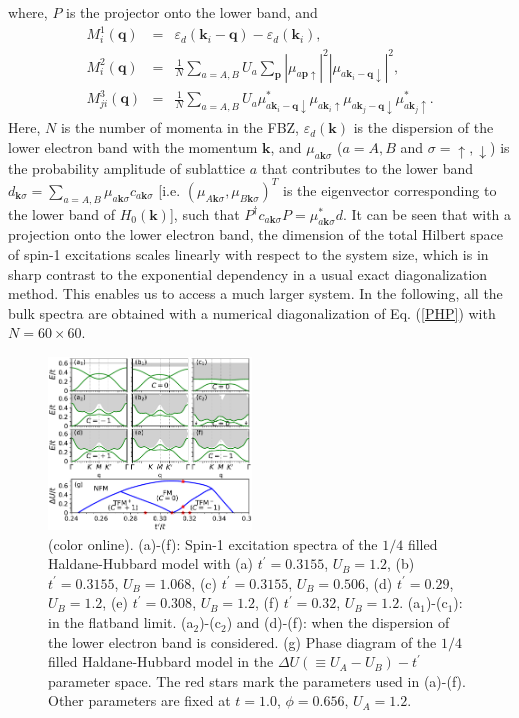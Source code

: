 \documentclass[amsmath,superscriptaddress,showpacs,aps,prl,twocolumn]{revtex4-1}
\begin{document}
where, $P$ is the projector onto the lower band, and
\begin{eqnarray}
M_{i}^1(\mathbf{q}) &=& \varepsilon_d(\mathbf{k}_i-\mathbf{q})-\varepsilon_d(\mathbf{k}_i), \label{M1}\\
M_{i}^2(\mathbf{q}) &=& \frac{1}{N}\sum_{a=A,B}U_a\sum_{\mathbf{p}}\left|\mu_{a\mathbf{p}\uparrow}\right|^2\left|\mu_{a\mathbf{k}_{i}-\mathbf{q}\downarrow}\right|^2, \label{M2}\\
M_{ji}^3(\mathbf{q}) &=& \frac{1}{N}\sum_{a=A,B}U_a
\mu^{\ast}_{a\mathbf{k}_i-\mathbf{q}\downarrow}\mu_{a\mathbf{k}_{i}\uparrow}\mu_{a\mathbf{k}_j-\mathbf{q}\downarrow}\mu^{\ast}_{a\mathbf{k}_{j}\uparrow}. \label{M3}
\end{eqnarray}
Here, $N$ is the number of momenta in the FBZ, $\varepsilon_d(\mathbf{k})$ is the dispersion of the lower electron band with the momentum $\mathbf{k}$, and $\mu_{a\mathbf{k}\sigma}$ ($a=A,B$ and $\sigma=\uparrow,\downarrow$) is the probability amplitude of sublattice $a$ that contributes to the lower band $d_{\mathbf{k}\sigma}=\sum_{a=A,B}\mu_{a\mathbf{k}\sigma}c_{a\mathbf{k}\sigma}$ [i.e. $\left(\mu_{A\mathbf{k}\sigma},\mu_{B\mathbf{k}\sigma}\right)^T$ is the eigenvector corresponding to the lower band of $H_0(\mathbf{k})$], such that $P^\dagger c_{a\mathbf{k}\sigma}P=\mu^\ast_{a\mathbf{k}\sigma}d$. It can be seen \cite{Su_PRB2018,Su_PRB2019} that with a projection onto the lower electron band, the dimension of the total Hilbert space of spin-1 excitations scales linearly with respect to the system size, which is in sharp contrast to the exponential dependency in a usual exact diagonalization method. This enables us to access a much larger system. In the following, all the bulk spectra are obtained with a numerical diagonalization of Eq. (\ref{PHP}) with $N=60\times60$.

\begin{figure}
\centering
\includegraphics[width=0.48\textwidth]{bulkresult}
\caption{(color online). (a)-(f): Spin-1 excitation spectra of the $1/4$ filled Haldane-Hubbard model with (a) $t^\prime=0.3155$, $U_B=1.2$, (b) $t^\prime=0.3155$, $U_B=1.068$, (c) $t^\prime=0.3155$, $U_B=0.506$, (d) $t^\prime=0.29$, $U_B=1.2$, (e) $t^\prime=0.308$, $U_B=1.2$, (f) $t^\prime=0.32$, $U_B=1.2$. (a$_1$)-(c$_1$): in the flatband limit. (a$_2$)-(c$_2$) and (d)-(f): when the dispersion of the lower electron band is considered. (g) Phase diagram of the $1/4$ filled Haldane-Hubbard model in the $\Delta U(\equiv U_A-U_B)-t^\prime$ parameter space. The red stars mark the parameters used in (a)-(f). Other parameters are fixed at $t=1.0$, $\phi=0.656$, $U_A=1.2$.}
\label{bulkresult}
\end{figure}
\end{document}
